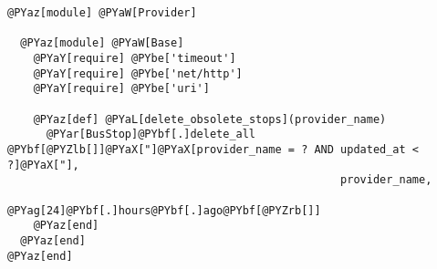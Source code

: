 \begin{Verbatim}[commandchars=@\[\]]
@PYaz[module] @PYaW[Provider]

  @PYaz[module] @PYaW[Base]
    @PYaY[require] @PYbe['timeout']
    @PYaY[require] @PYbe['net/http']
    @PYaY[require] @PYbe['uri']
    
    @PYaz[def] @PYaL[delete_obsolete_stops](provider_name)
      @PYar[BusStop]@PYbf[.]delete_all @PYbf[@PYZlb[]]@PYaX["]@PYaX[provider_name = ? AND updated_at < ?]@PYaX["],
                                                   provider_name,
                                                    @PYag[24]@PYbf[.]hours@PYbf[.]ago@PYbf[@PYZrb[]]
    @PYaz[end]
  @PYaz[end]
@PYaz[end]
\end{Verbatim}
